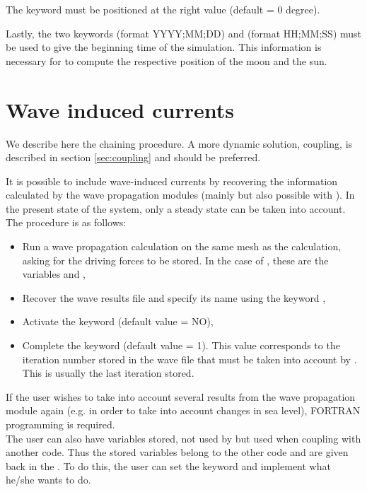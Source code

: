 The keyword  must be positioned at the right
value (default = 0 degree).

Lastly, the two keywords  (format YYYY;MM;DD)
and  (format HH;MM;SS) must be used
to give the beginning time of the simulation.
This information is necessary for  to compute the respective
position of the moon and the sun.


\section{Wave induced currents}

We describe here the chaining procedure.
A more dynamic solution, coupling, is described in section \ref{sec:coupling}
and should be preferred.

It is possible to include wave-induced currents by recovering the information
calculated by the wave propagation modules (mainly \tomawac but also possible
with \artemis).
In the present state of the system, only a steady state can be taken into
account.
The procedure is as follows:

\begin{itemize}
\item Run a wave propagation calculation on the same mesh as the 
calculation, asking for the driving forces to be stored.
In the case of \tomawac, these are the variables  and ,

\item Recover the wave results file and specify its name using the keyword
,

\item Activate the keyword  (default value = NO),

\item Complete the keyword 
(default value = 1).
This value corresponds to the iteration number stored in the wave file that must
be taken into account by . This is usually the last iteration stored.
\end{itemize}

If the user wishes to take into account several results from the wave
propagation module again (e.g. in order to take into account changes in sea
level), FORTRAN programming is required.\\

The user can also have variables stored, not used by  but used
when coupling  with another code.
Thus the stored variables belong to the other code and are given back
in the .
To do this, the user can set the 
keyword and implement what he/she wants to do.


